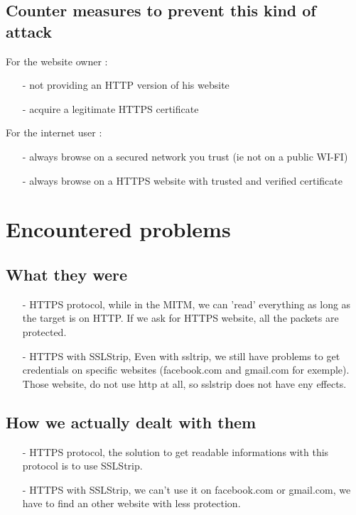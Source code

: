 \documentclass[a4paper, 11pt, oneside]{article}
\begin{document}
\subsection{Counter measures to prevent this kind of attack}
For the website owner : \\
\begin{itemize}
    \item[-] not providing an HTTP version of his website\\
    \item[-] acquire a legitimate HTTPS certificate\\
\end{itemize}

For the internet user : \\
\begin{itemize}
    \item[-] always browse on a secured network you trust (ie not on a public WI-FI)\\
    \item[-] always browse on a HTTPS website with trusted and verified certificate\\
\end{itemize}

\section{Encountered problems}

\subsection{What they were}
\begin{itemize}
    \item[-] HTTPS protocol, while in the MITM, we can 'read' everything as long as the target is on HTTP. If we ask for HTTPS website, all the packets are protected. \\
    \item[-] HTTPS with SSLStrip, Even with ssltrip, we still have problems to get credentials on specific websites (facebook.com and gmail.com for exemple). Those website, do not use http at all, so sslstrip does not have eny effects.\\
\end{itemize}

\subsection{How we actually dealt with them}
\begin{itemize}
    \item[-] HTTPS protocol, the solution to get readable informations with this protocol is to use SSLStrip.\\
    \item[-] HTTPS with SSLStrip, we can't use it on facebook.com or gmail.com, we have to find an other website with less protection.\\
\end{itemize}
    
\end{document}
